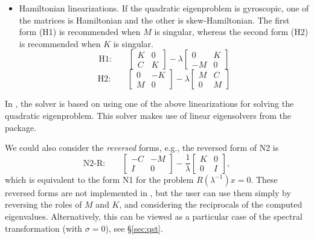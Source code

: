 \begin{itemize}
\medskip
\item Hamiltonian linearizations. If the quadratic eigenproblem is gyroscopic, one of the matrices is Hamiltonian and the other is skew-Hamiltonian. The first form (H1) is recommended when $M$ is singular, whereas the second form (H2) is recommended when $K$ is singular.
\begin{equation}
\label{eq:h1}
\mbox{H1:}\qquad
\left[\begin{array}{cc}K & 0\\C & K\end{array}\right]-\lambda\left[\begin{array}{cc} 0 & K\\-M & 0\end{array}\right]
\end{equation}
\begin{equation}
\label{eq:h2}
\mbox{H2:}\qquad
\left[\begin{array}{cc}0 & -K\\M & 0\end{array}\right]-\lambda\left[\begin{array}{cc}M & C\\ 0 & M\end{array}\right]
\end{equation}
\end{itemize}

In \slepc, the  solver is based on using one of the above linearizations for solving the quadratic eigenproblem. This solver makes use of linear eigensolvers from the  package.

We could also consider the \emph{reversed} forms, e.g., the reversed form of N2 is
\begin{equation}
\label{eq:n2r}
\mbox{N2-R:}\qquad
\left[\begin{array}{cc}-C & -M\\I & 0\end{array}\right]-\frac{1}{\lambda}\left[\begin{array}{cc}K & 0\\0 & I\end{array}\right],
\end{equation}
which is equivalent to the form N1 for the problem $R(\lambda^{-1})x=0$. These reversed forms are not implemented in \slepc, but the user can use them simply by reversing the roles of $M$ and $K$, and considering the reciprocals of the computed eigenvalues. Alternatively, this can be viewed as a particular case of the spectral transformation (with $\sigma=0$), see \S\ref{sec:qst}.

